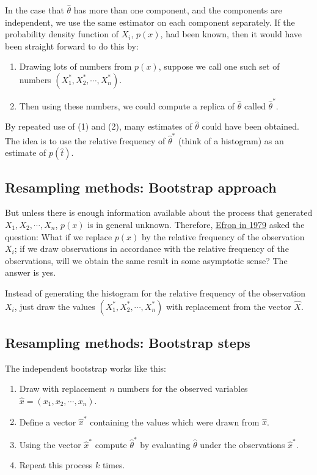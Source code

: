\documentclass[%
oneside,                 %
final,                   %
10pt]{article}
\begin{document}
In the case that $\widehat{\theta}$ has
more than one component, and the components are independent, we use the
same estimator on each component separately.  If the probability
density function of $X_i$, $p(x)$, had been known, then it would have
been straight forward to do this by: 
\begin{enumerate}
\item Drawing lots of numbers from $p(x)$, suppose we call one such set of numbers $(X_1^*, X_2^*, \cdots, X_n^*)$. 

\item Then using these numbers, we could compute a replica of $\widehat{\theta}$ called $\widehat{\theta}^*$. 
\end{enumerate}

\noindent
By repeated use of (1) and (2), many
estimates of $\widehat{\theta}$ could have been obtained. The
idea is to use the relative frequency of $\widehat{\theta}^*$
(think of a histogram) as an estimate of $p(\hat{t})$.

\subsection*{Resampling methods: Bootstrap approach}

But
unless there is enough information available about the process that
generated $X_1,X_2,\cdots,X_n$, $p(x)$ is in general
unknown. Therefore, \href{{https://projecteuclid.org/euclid.aos/1176344552}}{Efron in 1979}  asked the
question: What if we replace $p(x)$ by the relative frequency
of the observation $X_i$; if we draw observations in accordance with
the relative frequency of the observations, will we obtain the same
result in some asymptotic sense? The answer is yes.

Instead of generating the histogram for the relative
frequency of the observation $X_i$, just draw the values
$(X_1^*,X_2^*,\cdots,X_n^*)$ with replacement from the vector
$\hat{X}$. 

\subsection*{Resampling methods: Bootstrap steps}

The independent bootstrap works like this: 

\begin{enumerate}
\item Draw with replacement $n$ numbers for the observed variables $\hat{x} = (x_1,x_2,\cdots,x_n)$. 

\item Define a vector $\hat{x}^*$ containing the values which were drawn from $\hat{x}$. 

\item Using the vector $\hat{x}^*$ compute $\widehat{\theta}^*$ by evaluating $\widehat \theta$ under the observations $\hat{x}^*$. 

\item Repeat this process $k$ times. 
\end{enumerate}
\end{document}
